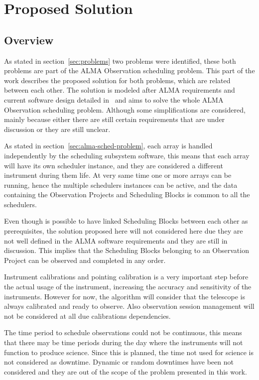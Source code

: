 \part{Proposed Solution}

\chapter{Overview}

As stated in section~\ref{sec:problems} two problems were identified, these both problems are part of the ALMA Observation scheduling problem.
This part of the work describes the proposed solution for both problems, which are related between each other.
The solution is modeled after ALMA requirements and current software design detailed in~\cite{avarias11,clarke12,schwarz04,apdm-model} and aims to solve the whole ALMA Observation scheduling problem. Although some simplifications are considered, mainly because either there are still certain requirements that are under discussion or they are still unclear. 

As stated in section~\ref{sec:alma-sched-problem}, each array is handled independently by the scheduling subsystem software, this means that each array will have its own scheduler instance, and they are considered a different instrument during them life. At very same time one or more arrays can be running, hence the multiple schedulers instances can be active, and the data containing the Observation Projects and Scheduling Blocks is common to all the schedulers.

Even though is possible to have linked Scheduling Blocks between each other as prerequisites, the solution proposed here will not considered here due they are not well defined in the ALMA software requirements and they are still in discussion. This implies that the Scheduling Blocks belonging to an Observation Project can be observed and completed in any order.

Instrument calibrations and pointing calibration is a very important step before the actual usage of the instrument, increasing the accuracy and sensitivity of the instruments. However for now, the algorithm will consider that the telescope is always calibrated and ready to observe. Also observation session management will not be considered at all due calibrations dependencies.

The time period to schedule observations could not be continuous, this means that there may be time periods during the day where the instruments will not function to produce science. Since this is planned, the time not used for science is not considered as downtime. Dynamic or random downtimes have been not considered and they are out of the scope of the problem presented in this work.

